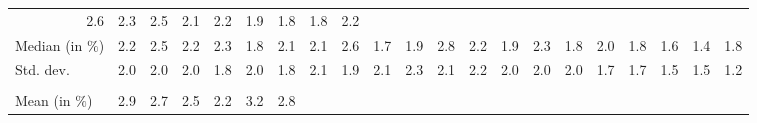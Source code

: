 \begin{tabular}{lllllllllllllllllllll}
  \multicolumn{1}{r}{2.6} &
  \multicolumn{1}{r}{2.3} &
  \multicolumn{1}{r}{2.5} &
  \multicolumn{1}{r}{2.1} &
  \multicolumn{1}{r}{2.2} &
  \multicolumn{1}{r}{1.9} &
  \multicolumn{1}{r}{1.8} &
  \multicolumn{1}{r}{1.8} &
  \multicolumn{1}{r}{2.2} \\
\multicolumn{1}{l}{\hspace{2em}Median (in $\%$)} &
  \multicolumn{1}{|r}{2.2} &
  \multicolumn{1}{r}{2.5} &
  \multicolumn{1}{r}{2.2} &
  \multicolumn{1}{r}{2.3} &
  \multicolumn{1}{r}{1.8} &
  \multicolumn{1}{r}{2.1} &
  \multicolumn{1}{r}{2.1} &
  \multicolumn{1}{r}{2.6} &
  \multicolumn{1}{r}{1.7} &
  \multicolumn{1}{r}{1.9} &
  \multicolumn{1}{r}{2.8} &
  \multicolumn{1}{r}{2.2} &
  \multicolumn{1}{r}{1.9} &
  \multicolumn{1}{r}{2.3} &
  \multicolumn{1}{r}{1.8} &
  \multicolumn{1}{r}{2.0} &
  \multicolumn{1}{r}{1.8} &
  \multicolumn{1}{r}{1.6} &
  \multicolumn{1}{r}{1.4} &
  \multicolumn{1}{r}{1.8} \\
\multicolumn{1}{l}{\hspace{2em}Std. dev.} &
  \multicolumn{1}{|r}{2.0} &
  \multicolumn{1}{r}{2.0} &
  \multicolumn{1}{r}{2.0} &
  \multicolumn{1}{r}{1.8} &
  \multicolumn{1}{r}{2.0} &
  \multicolumn{1}{r}{1.8} &
  \multicolumn{1}{r}{2.1} &
  \multicolumn{1}{r}{1.9} &
  \multicolumn{1}{r}{2.1} &
  \multicolumn{1}{r}{2.3} &
  \multicolumn{1}{r}{2.1} &
  \multicolumn{1}{r}{2.2} &
  \multicolumn{1}{r}{2.0} &
  \multicolumn{1}{r}{2.0} &
  \multicolumn{1}{r}{2.0} &
  \multicolumn{1}{r}{1.7} &
  \multicolumn{1}{r}{1.7} &
  \multicolumn{1}{r}{1.5} &
  \multicolumn{1}{r}{1.5} &
  \multicolumn{1}{r}{1.2} \\
\multicolumn{1}{l}{\hspace{1em}{\textit{Additive term} ($\widehat{t}/\widetilde{p}$)}} &
  \multicolumn{1}{|r}{} &
  \multicolumn{1}{r}{} &
  \multicolumn{1}{r}{} &
  \multicolumn{1}{r}{} &
  \multicolumn{1}{r}{} &
  \multicolumn{1}{r}{} &
  \multicolumn{1}{r}{} &
  \multicolumn{1}{r}{} &
  \multicolumn{1}{r}{} &
  \multicolumn{1}{r}{} &
  \multicolumn{1}{r}{} &
  \multicolumn{1}{r}{} &
  \multicolumn{1}{r}{} &
  \multicolumn{1}{r}{} &
  \multicolumn{1}{r}{} &
  \multicolumn{1}{r}{} &
  \multicolumn{1}{r}{} &
  \multicolumn{1}{r}{} &
  \multicolumn{1}{r}{} &
  \multicolumn{1}{r}{} \\
\multicolumn{1}{l}{\hspace{2em}Mean (in $\%$)} &
  \multicolumn{1}{|r}{2.9} &
  \multicolumn{1}{r}{2.7} &
  \multicolumn{1}{r}{2.5} &
  \multicolumn{1}{r}{2.2} &
  \multicolumn{1}{r}{3.2} &
  \multicolumn{1}{r}{2.8} &

\end{tabular}
